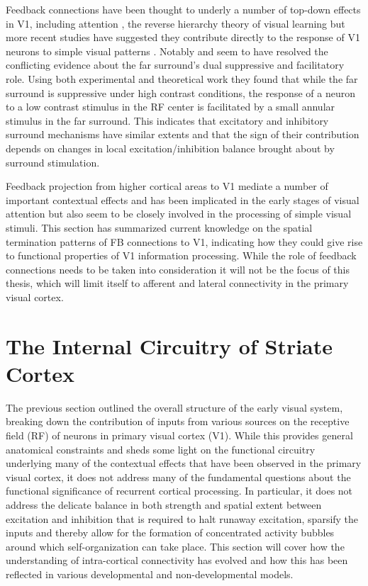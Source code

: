 Feedback connections have been thought to underly a number of top-down
effects in V1, including attention \citep{Treue2003}, the reverse
hierarchy theory of visual learning \citep{Ahissar2004} but more
recent studies have suggested they contribute directly to the response
of V1 neurons to simple visual patterns
\citep{Angelucci2002,Angelucci2003,Schwabe2006}. Notably
\cite{Schwabe2006} and \cite{Ichida2007} seem to have resolved the
conflicting evidence about the far surround's dual suppressive and
facilitatory role. Using both experimental and theoretical work they
found that while the far surround is suppressive under high contrast
conditions, the response of a neuron to a low contrast stimulus in the
RF center is facilitated by a small annular stimulus in the far
surround. This indicates that excitatory and inhibitory surround
mechanisms have similar extents and that the sign of their
contribution depends on changes in local excitation/inhibition balance
brought about by surround stimulation.

Feedback projection from higher cortical areas to V1 mediate a number
of important contextual effects and has been implicated in the early
stages of visual attention but also seem to be closely involved in the
processing of simple visual stimuli. This section has summarized
current knowledge on the spatial termination patterns of FB
connections to V1, indicating how they could give rise to functional
properties of V1 information processing. While the role of feedback
connections needs to be taken into consideration it will not be the
focus of this thesis, which will limit itself to afferent and lateral
connectivity in the primary visual cortex.

\section{The Internal Circuitry of Striate Cortex}


The previous section outlined the overall structure of the early visual
system, breaking down the contribution of inputs from various sources
on the receptive field (RF) of neurons in primary visual cortex
(V1). While this provides general anatomical constraints and sheds
some light on the functional circuitry underlying many of the
contextual effects that have been observed in the primary visual
cortex, it does not address many of the fundamental questions about
the functional significance of recurrent cortical processing. In
particular, it does not address the delicate balance in both strength
and spatial extent between excitation and inhibition that is required
to halt runaway excitation, sparsify the inputs and thereby allow for
the formation of concentrated activity bubbles around which
self-organization can take place. This section will cover how the
understanding of intra-cortical connectivity has evolved and how this
has been reflected in various developmental and non-developmental
models.

